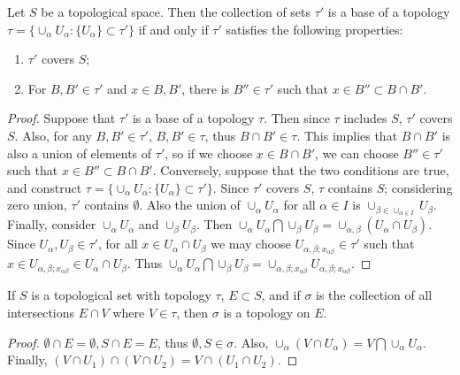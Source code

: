 \begin{prop} Let $S$ be a topological space. Then the collection of sets $\tau'$ is a base of a topology $\tau=\{\cup_\alpha U_\alpha:\{U_\alpha\}\subset \tau'\}$ if and only if $\tau'$ satisfies the following properties:
\begin{enumerate}
\item $\tau'$ covers $S$;
\item For $B,B'\in \tau'$ and $x\in B,B'$, there is $B''\in \tau'$ such that $x\in B''\subset B\cap B'$.
\end{enumerate}
\end{prop}
\begin{proof}
Suppose that $\tau'$ is a base of a topology $\tau$. Then since $\tau$ includes $S$, $\tau'$ covers $S$. Also, for any $B,B'\in \tau'$, $B,B'\in \tau$, thus $B\cap B'\in \tau$. This implies that $B\cap B'$ is also a union of elements of $\tau'$, so if we choose $x\in B\cap B'$, we can choose $B''\in \tau'$ such that $x\in B''\subset B\cap B'$. Conversely, suppose that the two conditions are true, and construct $\tau=\{\cup_\alpha U_\alpha:\{U_\alpha\}\subset \tau'\}$. Since $\tau'$ covers $S$, $\tau$ contains $S$; considering zero union, $\tau'$ contains $\emptyset$. Also the union of $\cup_\alpha U_\alpha$ for all $\alpha\in I$ is $\cup_{\beta\in \cup_{\alpha\in I}}U_\beta$. Finally, consider $\cup_\alpha U_\alpha$ and $\cup_\beta U_\beta$. Then $\cup_\alpha U_\alpha \bigcap \cup_\beta U_\beta=\cup_{\alpha,\beta}(U_\alpha\cap U_\beta)$. Since $U_\alpha,U_\beta\in \tau'$, for all $x\in U_\alpha\cap U_\beta$ we may choose $U_{\alpha,\beta;x_{\alpha\beta}}\in \tau'$ such that $x\in U_{\alpha,\beta;x_{\alpha\beta}}\in U_\alpha\cap U_\beta$. Thus $\cup_\alpha U_\alpha \bigcap \cup_\beta U_\beta=\cup_{\alpha,\beta;x_{\alpha\beta}}U_{\alpha,\beta;x_{\alpha\beta}}$.
\end{proof}

\begin{prop} If $S$ is a topological set with topology $\tau$, $E\subset S$, and if $\sigma$ is the collection of all intersections $E\cap V$ where $V\in \tau$, then $\sigma$ is a topology on $E$.
\end{prop}
\begin{proof}
$\emptyset\cap E=\emptyset, S\cap E=E$, thus $\emptyset,S\in \sigma$. Also, $\cup_\alpha(V\cap U_\alpha)=V\bigcap \cup_\alpha U_\alpha$. Finally, $(V\cap U_1)\cap (V\cap U_2)=V\cap (U_1\cap U_2)$.
\end{proof}

